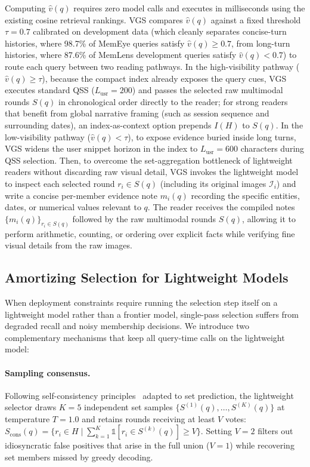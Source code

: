 \documentclass[10pt]{article}
\newcommand{\qss}{QSS}
\begin{document}
Computing $\hat{v}(q)$ requires zero model calls and executes in milliseconds using the existing cosine retrieval rankings. VGS compares $\hat{v}(q)$ against a fixed threshold $\tau{=}0.7$ calibrated on development data (which cleanly separates concise-turn histories, where 98.7\% of MemEye queries satisfy $\hat{v}(q) \ge 0.7$, from long-turn histories, where 87.6\% of MemLens development queries satisfy $\hat{v}(q) < 0.7$) to route each query between two reading pathways. In the high-visibility pathway ($\hat{v}(q) \ge \tau$), because the compact index already exposes the query cues, VGS executes standard \qss{} ($L_{\mathrm{usr}}{=}200$) and passes the selected raw multimodal rounds $S(q)$ in chronological order directly to the reader; for strong readers that benefit from global narrative framing (such as session sequence and surrounding dates), an index-as-context option prepends $I(H)$ to $S(q)$. In the low-visibility pathway ($\hat{v}(q) < \tau$), to expose evidence buried inside long turns, VGS widens the user snippet horizon in the index to $L_{\mathrm{usr}}{=}600$ characters during \qss{} selection. Then, to overcome the set-aggregation bottleneck of lightweight readers without discarding raw visual detail, VGS invokes the lightweight model to inspect each selected round $r_i \in S(q)$ (including its original images $\mathcal{I}_i$) and write a concise per-member evidence note $m_i(q)$ recording the specific entities, dates, or numerical values relevant to $q$. The reader receives the compiled notes $\{m_i(q)\}_{r_i \in S(q)}$ followed by the raw multimodal rounds $S(q)$, allowing it to perform arithmetic, counting, or ordering over explicit facts while verifying fine visual details from the raw images.

\subsection{Amortizing Selection for Lightweight Models}
\label{sec:lightweight}

When deployment constraints require running the selection step itself on a lightweight model rather than a frontier model, single-pass selection suffers from degraded recall and noisy membership decisions. We introduce two complementary mechanisms that keep all query-time calls on the lightweight model:

\paragraph{Sampling consensus.} Following self-consistency principles~\citep{wang2023selfconsistency} adapted to set prediction, the lightweight selector draws $K{=}5$ independent set samples $\{S^{(1)}(q), \dots, S^{(K)}(q)\}$ at temperature $T{=}1.0$ and retains rounds receiving at least $V$ votes: $S_{\mathrm{cons}}(q) = \{r_i \in H \mid \sum_{k=1}^K \mathbb{1}[r_i \in S^{(k)}(q)] \ge V\}$. Setting $V{=}2$ filters out idiosyncratic false positives that arise in the full union ($V{=}1$) while recovering set members missed by greedy decoding.
\end{document}
